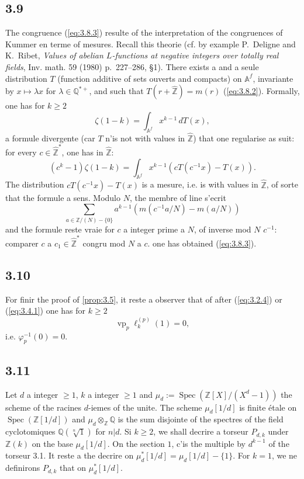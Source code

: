 \documentclass[12pt,a4paper]{article}
\theoremstyle{plain}
\theoremstyle{definition}
\theoremstyle{remark}
\DeclareMathOperator{\Spec}{Spec}
\providecommand{\Spec}{\operatorname{Spec}}
\begin{document}
\subsection*{3.9}

The congruence (\ref{eq:3.8.3}) resulte of the interpretation of the congruences of
Kummer en terme of mesures. Recall this theorie (cf. by example P.~Deligne and
K.~Ribet, \textit{Values of abelian $L$-functions at negative integers over totally real
fields}, Inv. math. 59 (1980) p.~227--286, \S1). There exists a and a seule distribution
$T$ (function additive of sets ouverts and compacts) on $\mathbb{A}^f$, invariante by
$x \mapsto \lambda x$ for $\lambda \in \mathbb{Q}^{*+}$, and such that $T(r + \hat{\mathbb{Z}})
= m(r)$ (\ref{eq:3.8.2}). Formally, one has for $k \geq 2$
\[
\zeta(1-k) = \int_{\mathbb{A}^f} x^{k-1} \, dT(x),
\]
a formule divergente (car $T$ n'is not with values in $\hat{\mathbb{Z}}$) that one
regularise as suit: for every $c \in \hat{\mathbb{Z}}^*$, one has in $\hat{\mathbb{Z}}$:
\begin{equation}\label{eq:3.9.1}
(c^k-1)\zeta(1-k) = \int_{\mathbb{A}^f} x^{k-1}(cT(c^{-1}x) - T(x)).
\end{equation}
The distribution $cT(c^{-1}x) - T(x)$ is a mesure, i.e. is with values in
$\hat{\mathbb{Z}}$, of sorte that the formule a sens. Modulo $N$, the membre of line
s'ecrit
\[
\sum_{a \in \mathbb{Z}/(N)-\{0\}} a^{k-1}(m(c^{-1}a/N) - m(a/N))
\]
and the formule reste vraie for $c$ a integer prime a $N$, of inverse mod $N$
$c^{-1}$: comparer $c$ a $c_1 \in \hat{\mathbb{Z}}^*$ congru mod $N$ a $c$. one has obtained
(\ref{eq:3.8.3}).

\subsection*{3.10}

For finir the proof of \ref{prop:3.5}, it reste a observer that of after
(\ref{eq:3.2.4}) or (\ref{eq:3.4.1}) one has for $k \geq 2$
\[
\operatorname{vp}_p \ell_k^{(p)}(1) = 0,
\]
i.e. $\varphi_p^{-1}(0) = 0$.

\subsection*{3.11}

Let $d$ a integer $\geq 1$, $k$ a integer $\geq 1$ and
$\mu_d:=\Spec(\mathbb{Z}[X]/(X^d-1))$ the scheme of the racines $d$-iemes of the unite. The
scheme $\mu_d[1/d]$ is finite étale on $\Spec(\mathbb{Z}[1/d])$ and
$\mu_d \otimes_{\mathbb{Z}} \mathbb{Q}$ is the sum disjointe of the spectres of the field
cyclotomiques $\mathbb{Q}(\sqrt[n]{1})$ for $n|d$. Si $k \geq 2$, we shall decrire
a torseur $P_{d,k}$ under $\mathbb{Z}(k)$ on the base $\mu_d[1/d]$. On the section $1$,
c'is the multiple by $d^{k-1}$ of the torseur 3.1. It reste a the decrire on
$\mu_d^*[1/d] = \mu_d[1/d] - \{1\}$. For $k = 1$, we ne definirons $P_{d,k}$ that
on $\mu_d^*[1/d]$.
\end{document}
